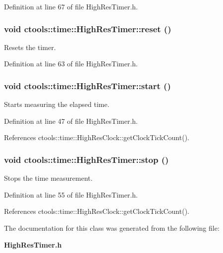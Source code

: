 Definition at line 67 of file High\-Res\-Timer.h.
\subsubsection{\setlength{\rightskip}{0pt plus 5cm}void ctools::time::High\-Res\-Timer::reset ()\hspace{0.3cm}{\tt  [inline]}}\label{classctools_1_1time_1_1HighResTimer_a3}


Resets the timer. 



Definition at line 63 of file High\-Res\-Timer.h.
\subsubsection{\setlength{\rightskip}{0pt plus 5cm}void ctools::time::High\-Res\-Timer::start ()\hspace{0.3cm}{\tt  [inline]}}\label{classctools_1_1time_1_1HighResTimer_a1}


Starts measuring the elapsed time. 



Definition at line 47 of file High\-Res\-Timer.h.

References ctools::time::High\-Res\-Clock::get\-Clock\-Tick\-Count().
\subsubsection{\setlength{\rightskip}{0pt plus 5cm}void ctools::time::High\-Res\-Timer::stop ()\hspace{0.3cm}{\tt  [inline]}}\label{classctools_1_1time_1_1HighResTimer_a2}


Stops the time measurement. 



Definition at line 55 of file High\-Res\-Timer.h.

References ctools::time::High\-Res\-Clock::get\-Clock\-Tick\-Count().

The documentation for this class was generated from the following file:\begin{CompactItemize}
\item 
{\bf High\-Res\-Timer.h}\end{CompactItemize}
